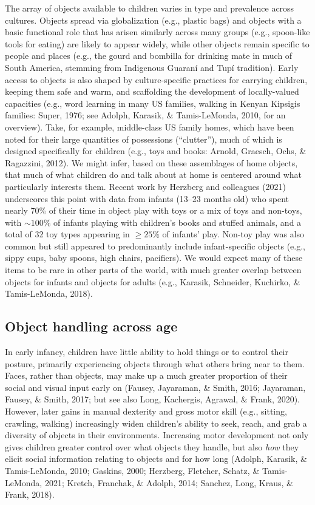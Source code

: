 \documentclass[10pt, letterpaper]{article}
\begin{document}
The array of objects available to children varies in type and prevalence
across cultures. Objects spread via globalization (e.g., plastic bags)
and objects with a basic functional role that has arisen similarly
across many groups (e.g., spoon-like tools for eating) are likely to
appear widely, while other objects remain specific to people and places
(e.g., the gourd and bombilla for drinking mate in much of South
America, stemming from Indigenous Guaraní and Tupí tradition). Early
access to objects is also shaped by culture-specific practices for
carrying children, keeping them safe and warm, and scaffolding the
development of locally-valued capacities (e.g., word learning in many US
families, walking in Kenyan Kipsigis families: Super, 1976; see Adolph,
Karasik, \& Tamis-LeMonda, 2010, for an overview). Take, for example,
middle-class US family homes, which have been noted for their large
quantities of possessions (``clutter''), much of which is designed
specifically for children (e.g., toys and books: Arnold, Graesch, Ochs,
\& Ragazzini, 2012). We might infer, based on these assemblages of home
objects, that much of what children do and talk about at home is
centered around what particularly interests them. Recent work by
Herzberg and colleagues (2021) underscores this point with data from
infants (13--23 months old) who spent nearly 70\% of their time in
object play with toys or a mix of toys and non-toys, with
\({\sim}100\%\) of infants playing with children's books and stuffed
animals, and a total of 32 toy types appearing in \({\ge}25\%\) of
infants' play. Non-toy play was also common but still appeared to
predominantly include infant-specific objects (e.g., sippy cups, baby
spoons, high chairs, pacifiers). We would expect many of these items to
be rare in other parts of the world, with much greater overlap between
objects for infants and objects for adults (e.g., Karasik, Schneider,
Kuchirko, \& Tamis-LeMonda, 2018).

\hypertarget{object-handling-across-age}{%
\subsection{Object handling across
age}\label{object-handling-across-age}}

In early infancy, children have little ability to hold things or to
control their posture, primarily experiencing objects through what
others bring near to them. Faces, rather than objects, may make up a
much greater proportion of their social and visual input early on
(Fausey, Jayaraman, \& Smith, 2016; Jayaraman, Fausey, \& Smith, 2017;
but see also Long, Kachergis, Agrawal, \& Frank, 2020). However, later
gains in manual dexterity and gross motor skill (e.g., sitting,
crawling, walking) increasingly widen children's ability to seek, reach,
and grab a diversity of objects in their environments. Increasing motor
development not only gives children greater control over what objects
they handle, but also \emph{how} they elicit social information relating
to objects and for how long (Adolph, Karasik, \& Tamis-LeMonda, 2010;
Gaskins, 2000; Herzberg, Fletcher, Schatz, \& Tamis-LeMonda, 2021;
Kretch, Franchak, \& Adolph, 2014; Sanchez, Long, Kraus, \& Frank,
2018).
\end{document}
